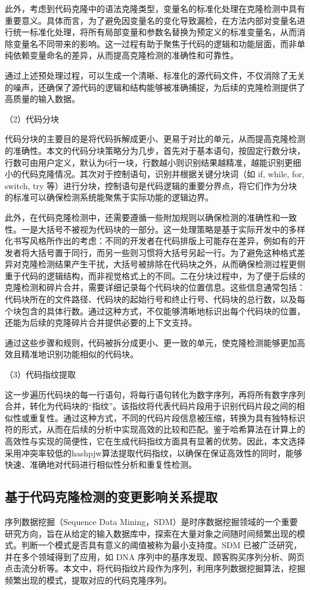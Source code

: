此外，考虑到代码克隆中的语法克隆类型，变量名的标准化处理在克隆检测中具有重要意义。具体而言，为了避免因变量名的变化导致漏检，在方法内部对变量名进行统一标准化处理，将所有局部变量和参数名替换为预定义的标准变量名，从而消除变量名不同带来的影响。这一过程有助于聚焦于代码的逻辑和功能层面，而非单纯依赖变量命名的差异，从而提高克隆检测的准确性和可靠性。

通过上述预处理过程，可以生成一个清晰、标准化的源代码文件，不仅消除了无关的噪声，还确保了源代码的逻辑和结构能够被准确捕捉，为后续的克隆检测提供了高质量的输入数据。

（2）代码分块

代码分块的主要目的是将代码拆解成更小、更易于对比的单元，从而提高克隆检测的准确性。本文的代码分块策略分为几步，首先对于基本语句，按固定行数分块，行数可由用户定义，默认为6行一块，行数越小则识别结果越精准，越能识别更细小的代码克隆情况。其次对于控制语句，识别并根据关键分块词（如 if, while, for, switch, try 等）进行分块，控制语句是代码逻辑的重要分界点，将它们作为分块的标准可以确保检测系统能聚焦于实际功能的逻辑边界。

此外，在代码克隆检测中，还需要遵循一些附加规则以确保检测的准确性和一致性。一是大括号不被视为代码块的一部分。这一处理策略是基于实际开发中的多样化书写风格所作出的考虑：不同的开发者在代码排版上可能存在差异，例如有的开发者将大括号置于同行，而另一些则习惯将大括号另起一行。为了避免这种格式差异对克隆检测结果产生干扰，大括号被排除在代码块之外，从而确保检测过程更侧重于代码的逻辑结构，而非视觉格式上的不同。二在分块过程中，为了便于后续的克隆检测和碎片合并，需要详细记录每个代码块的位置信息。这些信息通常包括：代码块所在的文件路径、代码块的起始行号和终止行号、代码块的总行数，以及每个块包含的具体行数。通过这种方式，不仅能够清晰地标识出每个代码块的位置，还能为后续的克隆碎片合并提供必要的上下文支持。

通过这些步骤和规则，代码被拆分成更小、更一致的单元，使克隆检测能够更加高效且精准地识别功能相似的代码块。

（3）代码指纹提取

这一步遍历代码块的每一行语句，将每行语句转化为数字序列，再将所有数字序列合并，转化为代码块的“指纹”。该指纹将代表代码片段用于识别代码片段之间的相似性或重复性。通过这种方式，不同的代码片段信息被压缩，转换为具有独特标识符的形式，从而在后续的分析中实现高效的比较和匹配。鉴于哈希算法在计算上的高效性与实现的简便性，它在生成代码指纹方面具有显著的优势。因此，本文选择采用冲突率较低的hashpjw算法提取代码指纹，以确保在保证高效性的同时，能够快速、准确地对代码进行相似性分析和重复性检测。


\subsection{基于代码克隆检测的变更影响关系提取}
序列数据挖掘（Sequence Data Mining，SDM）是时序数据挖掘领域的一个重要研究方向，旨在从给定的输入数据库中，探索在大量对象之间随时间频繁出现的模式。判断一个模式是否具有意义的阈值被称为最小支持度。SDM 已被广泛研究，并在多个领域得到了应用，如 DNA 序列中的基序发现、顾客购买序列分析、网页点击流分析等。本文中，将代码指纹片段作为序列，利用序列数据挖掘算法，挖掘频繁出现的模式，提取对应的代码克隆序列。

